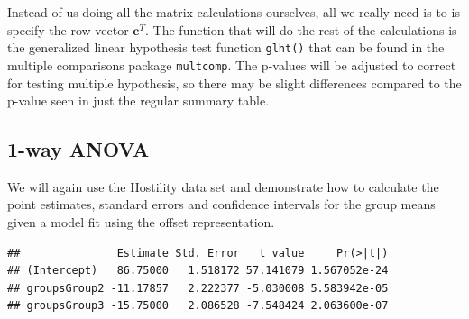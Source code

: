 \documentclass[]{book}
\newenvironment{Shaded}{\begin{snugshade}}{\end{snugshade}}
\newcommand{\KeywordTok}[1]{\textcolor[rgb]{0.13,0.29,0.53}{\textbf{{#1}}}}
\newcommand{\DecValTok}[1]{\textcolor[rgb]{0.00,0.00,0.81}{{#1}}}
\newcommand{\StringTok}[1]{\textcolor[rgb]{0.31,0.60,0.02}{{#1}}}
\newcommand{\NormalTok}[1]{{#1}}
\theoremstyle{definition}
\theoremstyle{definition}
\theoremstyle{remark}
\begin{document}
Instead of us doing all the matrix calculations ourselves, all we really
need is to is specify the row vector \(\boldsymbol{c}^{T}\). The
function that will do the rest of the calculations is the generalized
linear hypothesis test function \texttt{glht()} that can be found in the
multiple comparisons package \texttt{multcomp}. The p-values will be
adjusted to correct for testing multiple hypothesis, so there may be
slight differences compared to the p-value seen in just the regular
summary table.

\subsection{1-way ANOVA}\label{way-anova}

We will again use the Hostility data set and demonstrate how to
calculate the point estimates, standard errors and confidence intervals
for the group means given a model fit using the offset representation.

\begin{Shaded}
\end{Shaded}

\begin{verbatim}
##               Estimate Std. Error   t value     Pr(>|t|)
## (Intercept)   86.75000   1.518172 57.141079 1.567052e-24
## groupsGroup2 -11.17857   2.222377 -5.030008 5.583942e-05
## groupsGroup3 -15.75000   2.086528 -7.548424 2.063600e-07
\end{verbatim}
\end{document}
